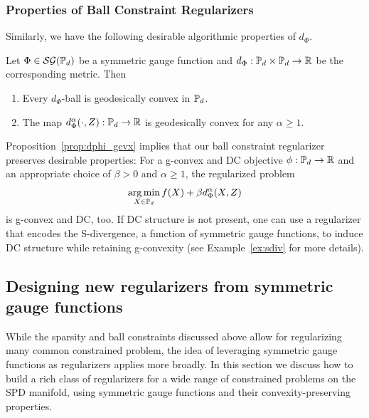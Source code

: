 \documentclass[sn-nature]{sn-jnl}%
\theoremstyle{thmstyleone}%
\theoremstyle{thmstyletwo}%
\theoremstyle{thmstylethree}%
\begin{document}
\subsubsection{Properties of Ball Constraint Regularizers}
Similarly, we have the following desirable algorithmic properties of $d_\Phi$. 


    \begin{prop}\label{prop:dphi_gcvx}
        Let $\Phi \in \mathcal{SG}(\mathbb{P}_d)$ be a symmetric gauge function and $d_\Phi: \mathbb{P}_d \times \mathbb{P}_d \to \mathbb{R}$ be the corresponding metric. Then 
        \begin{enumerate}
            \item Every $d_\Phi$-ball is geodesically convex in $\mathbb{P}_d$.
            \item The map $d_\Phi^\alpha(\cdot, Z): \mathbb{P}_d \to \mathbb{R}$ is geodesically convex for any $\alpha \geq 1.$
        \end{enumerate}
    \end{prop}

\noindent Proposition~\ref{prop:dphi_gcvx} implies that our ball constraint regularizer preserves desirable properties: For a g-convex and DC objective $\phi: \mathbb{P}_d \to \mathbb{R}$ and an appropriate choice of $\beta >0$ and $\alpha \geq 1$, the regularized problem 
\[
\operatorname*{arg\,min}_{X \in \mathbb{P}_d} f(X) + \beta d_\Phi^\alpha(X, Z) 
\]
is g-convex and DC, too. If DC structure is not present, one can use a regularizer that encodes the S-divergence, a function of symmetric gauge functions, to induce DC structure while retaining g-convexity (see Example~\ref{ex:sdiv} for more details).




\subsection{Designing new regularizers from symmetric gauge functions}\label{section:generating_reg_SG}
While the sparsity and ball constraints discussed above allow for regularizing many common constrained problem, the idea of leveraging symmetric gauge functions as regularizers applies more broadly. In this section we discuss how to build a rich class of regularizers for a wide range of constrained problems on the SPD manifold, using symmetric gauge functions and their convexity-preserving properties.
\end{document}

